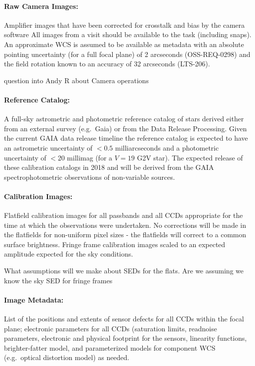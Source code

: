 \paragraph*{Raw Camera Images:} Amplifier images that have been corrected for crosstalk and bias by the camera software All images from a visit should be available to the task (including snaps). An approximate WCS is assumed to be available as metadata with an absolute pointing uncertainty (for a full focal plane) of 2 arcseconds (OSS-REQ-0298) and the field rotation known to an accuracy of 32 arcseconds (LTS-206).
\begin{note}
question into Andy R about Camera operations
\end{note}


\paragraph*{Reference Catalog:} A full-sky astrometric and photometric reference catalog of stars derived either from an external survey (e.g.\ Gaia) or from the Data Release Processing. Given the current GAIA data release timeline the reference catalog is expected to have an astrometric uncertainty of $<0.5$ milliarcseconds and a photometric uncertainty of $<$20 millimag (for a $V=19$ G2V star). The expected release of these calibration catalogs in 2018 and will be derived from the GAIA spectrophotometric observations of non-variable sources.

\paragraph*{Calibration Images:} Flatfield calibration images for all passbands and all CCDs appropriate for the time at which the observations were undertaken. No corrections will be made in the flatfields for non-uniform pixel sizes - the flatfields will correct to a common  surface brightness. Fringe frame calibration images scaled to an expected amplitude expected for the sky conditions.
\begin{note} What assumptions will we make about SEDs for the flats. Are we assuming we know the sky SED for fringe frames \end{note}

\paragraph*{Image Metadata:} List of the positions and extents of sensor defects for all CCDs within the focal plane; electronic parameters for all CCDs (saturation limits, readnoise parameters, electronic and physical footprint for the sensors, linearity functions, brighter-fatter model, and parameterized models for component WCS (e.g.\ optical distortion model) as needed.

